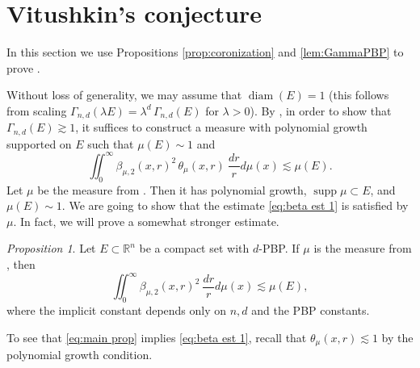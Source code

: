 \documentclass[11pt,reqno]{amsart}
\DeclareMathOperator{\diam}{diam}
\theoremstyle{definition}
\theoremstyle{remark}
\numberwithin{equation}{section}
\newcommand{\R}{\mathbb{R}}
\DeclareMathOperator{\supp}{supp}
\theoremstyle{theorem}
\newtheorem{propo}[theorem]{Proposition}
\theoremstyle{definition}
\theoremstyle{remark}
\numberwithin{equation}{section}
\begin{document}
	\section{Vitushkin's conjecture}\label{sec:analytic}
	In this section we use Propositions \ref{prop:coronization} and \ref{lem:GammaPBP} to prove . 
 
 \vspace{0.5em}
 Without loss of generality, we may assume that $\diam(E)=1$ (this follows from scaling $\Gamma_{n,d}(\lambda E) = \lambda^d\,\Gamma_{n,d}(E)$ for $\lambda>0$). By , in order to show that $\Gamma_{n,d}(E)\gtrsim 1$, it suffices to construct a measure with polynomial growth supported on $E$ such that $\mu(E)\sim1$ and
	\begin{equation}\label{eq:beta est 1}
	\iint_0^{\infty} \beta_{\mu,2}(x,r)^2\,\theta_\mu(x,r)\ \frac{dr}{r}d\mu(x) \lesssim \mu(E).
	\end{equation}
	Let $\mu$ be the measure from . Then it has polynomial growth, $\supp\mu\subset E$, and $\mu(E)\sim1$. We are going to show that the estimate \eqref{eq:beta est 1} is satisfied by $\mu$. In fact, we will prove a somewhat stronger estimate.
	
	\begin{propo}\label{prop:main}
		Let $E\subset\R^n$ be a compact set with $d$-PBP. If $\mu$ is the measure from , then
		\begin{equation}\label{eq:main prop}
		\iint_0^{\infty} \beta_{\mu,2}(x,r)^2\ \frac{dr}{r}d\mu(x) \lesssim \mu(E),
		\end{equation}
		where the implicit constant depends only on $n,d$ and the PBP constants.
	\end{propo}

	To see that \eqref{eq:main prop} implies \eqref{eq:beta est 1}, recall that $\theta_\mu(x,r)\lesssim 1$ by the polynomial growth condition.
\end{document}
